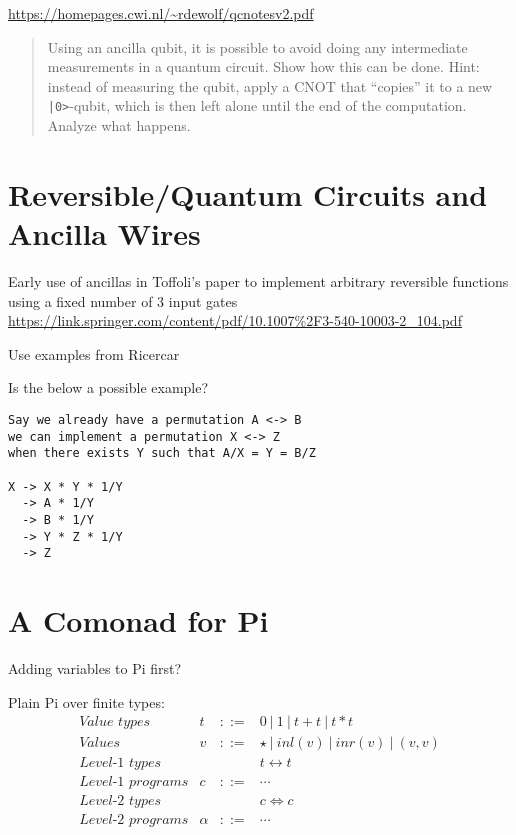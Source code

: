 \documentclass[sigplan,10pt,review,anonymous]{acmart}
\begin{document}
\url{https://homepages.cwi.nl/~rdewolf/qcnotesv2.pdf}
\begin{quote}
Using an ancilla qubit, it is possible to avoid doing any intermediate measurements in a quantum circuit. Show how this can be done.  Hint: instead of measuring the qubit, apply a CNOT that “copies” it to a new \verb.|0>.-qubit, which is then left alone until the end of the computation. Analyze what happens.
\end{quote}

\section{Reversible/Quantum Circuits and Ancilla Wires} 

Early use of ancillas in Toffoli's paper to implement arbitrary reversible functions using a fixed number of 3 input gates \url{https://link.springer.com/content/pdf/10.1007%2F3-540-10003-2_104.pdf}

Use examples from Ricercar

Is the below a possible example?
\begin{verbatim}
Say we already have a permutation A <-> B
we can implement a permutation X <-> Z 
when there exists Y such that A/X = Y = B/Z

X -> X * Y * 1/Y 
  -> A * 1/Y
  -> B * 1/Y
  -> Y * Z * 1/Y
  -> Z
\end{verbatim}

\section{A Comonad for Pi}

Adding variables to Pi first?

\newcommand{\alt}{~|~}
\newcommand{\inlv}[1]{\ensuremath{\mathit{inl}(v)}}
\newcommand{\inrv}[1]{\ensuremath{\mathit{inr}(v)}}
\newcommand{\pointed}[2]{[#1 \bullet #2]}

Plain Pi over finite types:
\[\begin{array}{lrcl}
\textit{Value types} & t &::=& 0 \alt 1 \alt t+t \alt t*t \\
\textit{Values}      & v &::=& \star \alt \inlv{v} \alt \inrv{v} \alt (v,v) \\
\textit{Level-1 types} &&& t \leftrightarrow t \\
\textit{Level-1 programs} & c &::=& \cdots \\
\textit{Level-2 types} &&& c \Leftrightarrow c \\
\textit{Level-2 programs} & \alpha &::=& \cdots 
\end{array}\]
\end{document}
